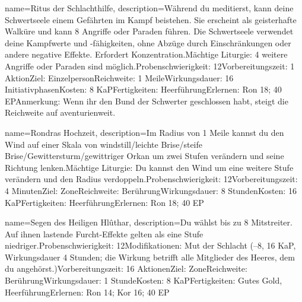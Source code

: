 {
    name={Ritus der Schlachthilfe},
    description={Während du meditierst, kann deine Schwertseele einem Gefährten im Kampf beistehen. Sie erscheint als geisterhafte Walküre und kann 8 Angriffe oder Paraden führen. Die Schwertseele verwendet deine Kampfwerte und -fähigkeiten, ohne Abzüge durch Einschränkungen oder andere negative Effekte. Erfordert Konzentration.\newline Mächtige Liturgie: 4 weitere Angriffe oder Paraden sind möglich.\newline Probenschwierigkeit: 12\newline Vorbereitungszeit: 1 Aktion\newline Ziel: Einzelperson\newline Reichweite: 1 Meile\newline Wirkungsdauer: 16 Initiativphasen\newline Kosten: 8 KaP\newline Fertigkeiten: Heerführung\newline Erlernen: Ron 18; 40 EP\newline Anmerkung: Wenn ihr den Bund der Schwerter geschlossen habt, steigt die Reichweite auf aventurienweit.}
}


{
    name={Rondras Hochzeit},
    description={Im Radius von 1 Meile kannst du den Wind auf einer Skala von windstill/leichte Brise/steife Brise/Gewittersturm/gewittriger Orkan um zwei Stufen verändern und seine Richtung lenken.\newline Mächtige Liturgie: Du kannst den Wind um eine weitere Stufe verändern und den Radius verdoppeln.\newline Probenschwierigkeit: 12\newline Vorbereitungszeit: 4 Minuten\newline Ziel: Zone\newline Reichweite: Berührung\newline Wirkungsdauer: 8 Stunden\newline Kosten: 16 KaP\newline Fertigkeiten: Heerführung\newline Erlernen: Ron 18; 40 EP}
}


{
    name={Segen des Heiligen Hlûthar},
    description={Du wählst bis zu 8 Mitstreiter. Auf ihnen lastende Furcht-Effekte gelten als eine Stufe niedriger.\newline Probenschwierigkeit: 12\newline Modifikationen: Mut der Schlacht (–8, 16 KaP, Wirkungsdauer 4 Stunden; die Wirkung betrifft alle Mitglieder des Heeres, dem du angehörst.)\newline Vorbereitungszeit: 16 Aktionen\newline Ziel: Zone\newline Reichweite: Berührung\newline Wirkungsdauer: 1 Stunde\newline Kosten: 8 KaP\newline Fertigkeiten: Gutes Gold, Heerführung\newline Erlernen: Ron 14; Kor 16; 40 EP}
}


